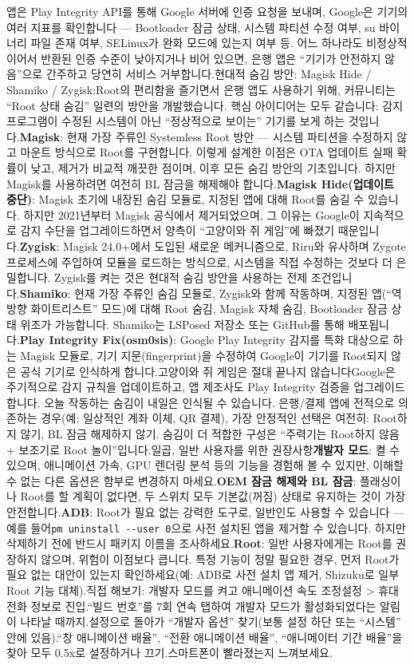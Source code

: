 앱은 Play Integrity API를 통해 Google 서버에 인증 요청을 보내며, Google은 기기의 여러 지표를 확인합니다 — Bootloader 잠금 상태, 시스템 파티션 수정 여부, su 바이너리 파일 존재 여부, SELinux가 완화 모드에 있는지 여부 등. 어느 하나라도 비정상적이어서 반환된 인증 수준이 낮아지거나 비어 있으면, 은행 앱은 “기기가 안전하지 않음”으로 간주하고 당연히 서비스 거부합니다.현대적 숨김 방안: Magisk Hide / Shamiko / Zygisk:Root의 편리함을 즐기면서 은행 앱도 사용하기 위해, 커뮤니티는 “Root 상태 숨김” 일련의 방안을 개발했습니다. 핵심 아이디어는 모두 같습니다: 감지 프로그램이 수정된 시스템이 아닌 “정상적으로 보이는” 기기를 보게 하는 것입니다.\textbf{Magisk}: 현재 가장 주류인 Systemless Root 방안 — 시스템 파티션을 수정하지 않고 마운트 방식으로 Root를 구현합니다. 이렇게 설계한 이점은 OTA 업데이트 실패 확률이 낮고, 제거가 비교적 깨끗한 점이며, 이후 모든 숨김 방안의 기초입니다. 하지만 Magisk를 사용하려면 여전히 BL 잠금을 해제해야 합니다.\textbf{Magisk Hide(업데이트 중단)}: Magisk 초기에 내장된 숨김 모듈로, 지정된 앱에 대해 Root를 숨길 수 있습니다. 하지만 2021년부터 Magisk 공식에서 제거되었으며, 그 이유는 Google이 지속적으로 감지 수단을 업그레이드하면서 양측이 “고양이와 쥐 게임”에 빠졌기 때문입니다.\textbf{Zygisk}: Magisk 24.0+에서 도입된 새로운 메커니즘으로, Riru와 유사하며 Zygote 프로세스에 주입하여 모듈을 로드하는 방식으로, 시스템을 직접 수정하는 것보다 더 은밀합니다. Zygisk를 켜는 것은 현대적 숨김 방안을 사용하는 전제 조건입니다.\textbf{Shamiko}: 현재 가장 주류인 숨김 모듈로, Zygisk와 함께 작동하며, 지정된 앱(“역방향 화이트리스트” 모드)에 대해 Root 숨김, Magisk 자체 숨김, Bootloader 잠금 상태 위조가 가능합니다. Shamiko는 LSPosed 저장소 또는 GitHub를 통해 배포됩니다.\textbf{Play Integrity Fix(osm0sis)}: Google Play Integrity 감지를 특화 대상으로 하는 Magisk 모듈로, 기기 지문(fingerprint)을 수정하여 Google이 기기를 Root되지 않은 공식 기기로 인식하게 합니다.고양이와 쥐 게임은 절대 끝나지 않습니다Google은 주기적으로 감지 규칙을 업데이트하고, 앱 제조사도 Play Integrity 검증을 업그레이드합니다. 오늘 작동하는 숨김이 내일은 인식될 수 있습니다. 은행/결제 앱에 전적으로 의존하는 경우(예: 일상적인 계좌 이체, QR 결제), 가장 안정적인 선택은 여전히: Root하지 않기, BL 잠금 해제하지 않기. 숨김이 더 적합한 구성은 “주력기는 Root하지 않음 + 보조기로 Root 놀이”입니다.일곱, 일반 사용자를 위한 권장사항\textbf{개발자 모드}: 켤 수 있으며, 애니메이션 가속, GPU 렌더링 분석 등의 기능을 경험해 볼 수 있지만, 이해할 수 없는 다른 옵션은 함부로 변경하지 마세요.\textbf{OEM 잠금 해제와 BL 잠금}: 플래싱이나 Root를 할 계획이 없다면, 두 스위치 모두 기본값(꺼짐) 상태로 유지하는 것이 가장 안전합니다.\textbf{ADB}: Root가 필요 없는 강력한 도구로, 일반인도 사용할 수 있습니다 — 예를 들어\texttt{pm uninstall -\allowbreak -\allowbreak user 0}으로 사전 설치된 앱을 제거할 수 있습니다. 하지만 삭제하기 전에 반드시 패키지 이름을 조사하세요.\textbf{Root}: 일반 사용자에게는 Root를 권장하지 않으며, 위험이 이점보다 큽니다. 특정 기능이 정말 필요한 경우, 먼저 Root가 필요 없는 대안이 있는지 확인하세요(예: ADB로 사전 설치 앱 제거, Shizuku로 일부 Root 기능 대체).직접 해보기: 개발자 모드를 켜고 애니메이션 속도 조정설정 > 휴대전화 정보로 진입.“빌드 번호”를 7회 연속 탭하여 개발자 모드가 활성화되었다는 알림이 나타날 때까지.설정으로 돌아가 “개발자 옵션” 찾기(보통 설정 하단 또는 “시스템” 안에 있음).“창 애니메이션 배율”, “전환 애니메이션 배율”, “애니메이터 기간 배율”을 찾아 모두 0.5x로 설정하거나 끄기.스마트폰이 빨라졌는지 느껴보세요.
